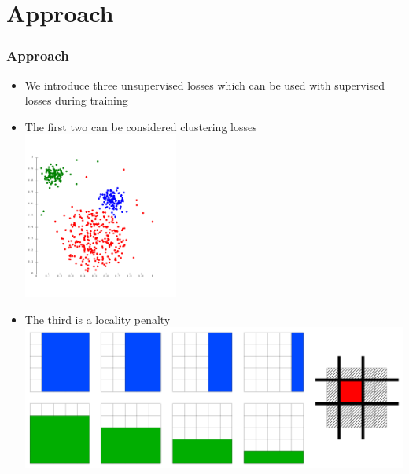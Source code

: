 \section{Approach}
\begin{frame}
	\frametitle{Approach}
	\begin{itemize}
		\item We introduce three unsupervised losses which can be used with supervised losses during
			training
		\item The first two can be considered clustering losses
			\includegraphics[width=0.4\textwidth, height=0.2\textwidth, center]{images/clust2}
		\item The third is a locality penalty
			\includegraphics[scale=0.3, center]{images/locality}
	\end{itemize}
\end{frame}






